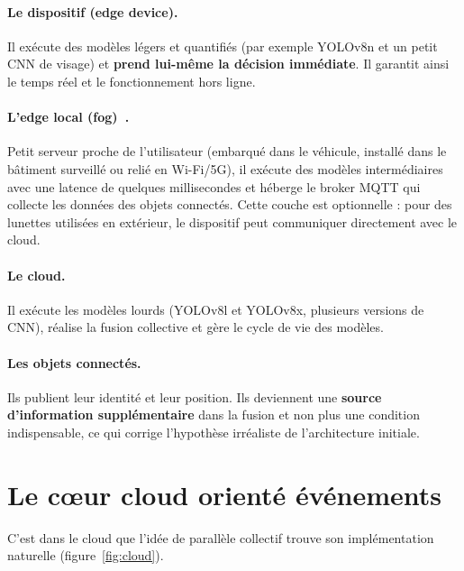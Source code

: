 \documentclass[11pt,a4paper]{report}
\begin{document}
\paragraph{Le dispositif (edge device).} Il exécute des modèles légers et quantifiés (par exemple YOLOv8n et un petit CNN de visage) et \textbf{prend lui-même la décision immédiate}. Il garantit ainsi le temps réel et le fonctionnement hors ligne.

\paragraph{L'edge local (fog)~\cite{bonomi2012}.} Petit serveur proche de l'utilisateur (embarqué dans le véhicule, installé dans le bâtiment surveillé ou relié en Wi-Fi/5G), il exécute des modèles intermédiaires avec une latence de quelques millisecondes et héberge le broker MQTT qui collecte les données des objets connectés. Cette couche est optionnelle : pour des lunettes utilisées en extérieur, le dispositif peut communiquer directement avec le cloud.

\paragraph{Le cloud.} Il exécute les modèles lourds (YOLOv8l et YOLOv8x, plusieurs versions de CNN), réalise la fusion collective et gère le cycle de vie des modèles.

\paragraph{Les objets connectés.} Ils publient leur identité et leur position. Ils deviennent une \textbf{source d'information supplémentaire} dans la fusion et non plus une condition indispensable, ce qui corrige l'hypothèse irréaliste de l'architecture initiale.

\section{Le cœur cloud orienté événements}

C'est dans le cloud que l'idée de \og parallèle collectif \fg{} trouve son implémentation naturelle (figure~\ref{fig:cloud}).
\end{document}
